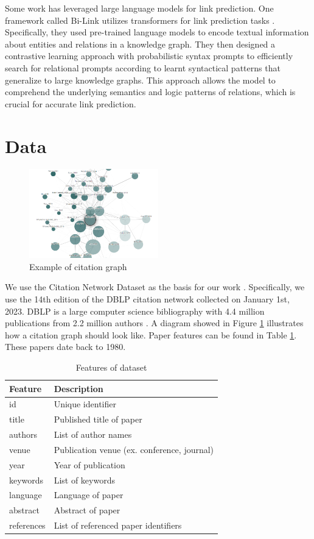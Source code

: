 \documentclass[10pt,twocolumn,letterpaper]{article}
\begin{document}
Some work has leveraged large language models for link prediction. One  framework called Bi-Link utilizes transformers for link prediction tasks \cite{peng2022bi}. Specifically, they used pre-trained language models to encode textual information about entities and relations in a knowledge graph. They then designed a contrastive learning approach with probabilistic syntax prompts to efficiently search for relational prompts according to learnt syntactical patterns that generalize to large knowledge graphs. This approach allows the model to comprehend the underlying semantics and logic patterns of relations, which is crucial for accurate link prediction.

\section{Data}
\begin{figure}
   \centering
   \includegraphics[width=0.5\textwidth]{figures/cit_graph.png}
   \caption{Example of citation graph}
   \label{fig:cite_graph}
\end{figure}

We use the Citation Network Dataset as the basis for our work \cite{tang2008arnetminer}. Specifically, we use the 14th edition of the DBLP citation network collected on January 1st, 2023. DBLP is a large computer science bibliography with 4.4 million publications from 2.2 million authors \cite{ley2002dblp}. A diagram showed in Figure \ref{fig:cite_graph} illustrates how a citation graph should look like. 
Paper features can be found in Table \ref{tab:dataset}. These papers date back to 1980.

\begin{table}
   \centering
   \begin{tabular}{l|l}
      \toprule
      Feature & Description \\
      \midrule
      id & Unique identifier \\
      title & Published title of paper \\
      authors & List of author names \\
      venue & Publication venue (ex. conference, journal) \\
      year & Year of publication \\
      keywords & List of keywords \\
      language & Language of paper \\
      abstract & Abstract of paper \\
      references & List of referenced paper identifiers \\
      \bottomrule
   \end{tabular}
   \caption{Features of dataset}
   \label{tab:dataset}
\end{table}
\end{document}

